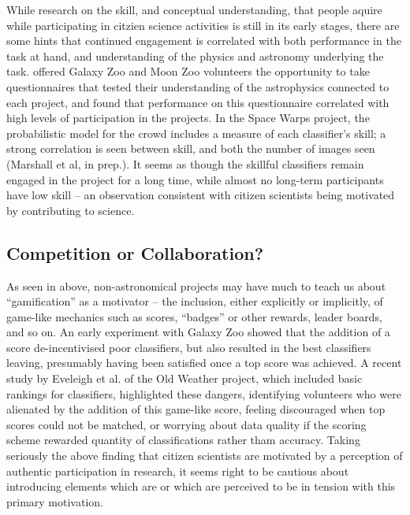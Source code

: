 \documentclass{ar2e}
\begin{document}
While research on the skill, and conceptual understanding, that  people aquire
while participating in citzien science activities is still in its early
stages, there are some hints that continued engagement is correlated with both
performance in the task at hand, and understanding of the physics and
astronomy underlying the task. \citet{Prather++2013} offered Galaxy Zoo and
Moon Zoo volunteers the opportunity to take questionnaires that tested their
understanding of the astrophysics connected to each project, and found that
performance on this questionnaire correlated with high levels of participation
in the projects. In the Space Warps project, the probabilistic model for the
crowd includes a measure of each classifier's skill; a strong correlation is
seen between skill, and both the number of images seen (Marshall et al, in
prep.). It seems as though the skillful classifiers remain engaged in the
project for a long time, while almost no long-term participants have low skill
-- an observation consistent with citizen scientists being motivated by
contributing to science.



\subsection{Competition or Collaboration?}
\label{sec:crowd:gamification}

As seen in  above, non-astronomical projects may have
much to teach us about ``gamification'' as a motivator -- the inclusion, either
explicitly or implicitly, of game-like mechanics such as scores, ``badges'' or
other rewards, leader boards, and so on. An early experiment with Galaxy Zoo
showed that the addition of a score de-incentivised poor classifiers, but also
resulted in the best classifiers leaving, presumably having been satisfied once
a top score was achieved. A recent study by Eveleigh et al. of the Old Weather
project, which included basic rankings for classifiers, highlighted these
dangers, identifying volunteers who were alienated by the addition of this
game-like score, feeling discouraged when top scores could not be matched, or
worrying about data quality if the scoring scheme rewarded quantity of
classifications rather tham accuracy. Taking seriously the above finding 
that citizen scientists are motivated by a perception of authentic
participation in research, it seems right to be cautious about introducing
elements which are or which are perceived to be in tension with this primary
motivation. 
\end{document}
